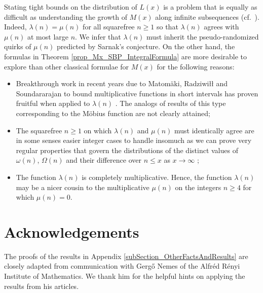 \documentclass[11pt,reqno,a4letter]{article}
\newcommand{\hlocalref}[1]{\hyperref[#1]{\ref{#1}}}
\numberwithin{equation}{section}
\numberwithin{figure}{section}
\numberwithin{table}{section}
\let\citep\cite
\newcommand{\cf}{cf.~}
\theoremstyle{plain}
\numberwithin{theorem}{section}
\theoremstyle{definition}
\theoremstyle{remark}
\begin{document}
Stating tight bounds on the distribution of 
$L(x)$ is a problem that is equally as difficult 
as understanding the growth of $M(x)$
along infinite subsequences (\cf \cite{MR2877066,MR3779960,TAO-LOGAVGD-CHOWLA}). 
Indeed, $\lambda(n) = \mu(n)$ for all squarefree $n \geq 1$ so that 
$\lambda(n)$ agrees with $\mu(n)$ at most large $n$. 
We infer that $\lambda(n)$ must inherit the pseudo-randomized quirks 
of $\mu(n)$ predicted by Sarnak's conjecture. 
On the other hand, the formulas in 
Theorem \hlocalref{prop_Mx_SBP_IntegralFormula} are more desirable to explore than 
other classical formulae for $M(x)$ for the following reasons:
\begin{itemize}
\item Breakthrough work in recent years due to 
	Matom\"aki, Radziwi{\l\l} and Soundararajan to 
	bound multiplicative functions 
	in short intervals has 
	proven fruitful when applied to $\lambda(n)$ 
	\cite{SOUND-LLAMBDA-SHORT-INTS,MATRADZE-MULTFUNCS-SHORT-INTS}. 
	The analogs of results of this type corresponding 
	to the M\"obius function are not clearly attained; 
\item The squarefree $n \geq 1$ on which $\lambda(n)$ and $\mu(n)$ must identically agree 
	are in some senses easier integer cases to handle 
	insomuch as we can prove very regular properties 
	that govern the distributions of the distinct values of 
	$\omega(n)$, $\Omega(n)$ and their difference over $n \leq x$ as $x \rightarrow \infty$ 
	\citep[\cf \S 2.4; \S 7.4]{MV}; 
\item The function $\lambda(n)$ is completely 
	multiplicative. Hence, the function $\lambda(n)$ may be 
	a nicer cousin to the multiplicative $\mu(n)$ on the 
	integers $n \geq 4$ for which $\mu(n) = 0$. 
\end{itemize}

\section*{Acknowledgements}

The proofs of the results in 
Appendix \hlocalref{subSection_OtherFactsAndResults} 
are closely adapted from communication with 
Gerg\H{o} Nemes of the Alfr\'{e}d R\'{e}nyi Institute of Mathematics. 
We thank him for the helpful hints on applying the results from his articles. 

\renewcommand{\refname}{Reference} 

{}
\end{document}
